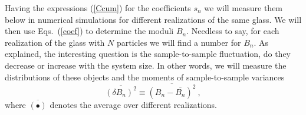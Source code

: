 \documentclass[pre,twocolumn,aps,10pt,superscriptaddress,notitlepage,nofootinbib]{revtex4-1}
\begin{document}
Having the expressions (\ref{Ccum}) for the coefficients $s_n$ we will measure them below in numerical
simulations for different realizations of the same glass. We will then use Eqs.~(\ref{coef}) to determine
the moduli $B_n$. Needless to say, for each realization of the glass with $N$ particles we will
find a number for $B_n$. As explained, the interesting question is the sample-to-sample fluctuation, do they
decrease or increase with the system size. In other words, we will measure the distributions
of these objects and the moments of sample-to-sample variances
\begin{equation}
\overline{(\delta B_n)^2} \equiv \overline{(B_n-\overline{B_n})^2}\ , \label{var}
\end{equation}
where $\overline{(\bullet)}$ denotes the average over different realizations.
\end{document}
